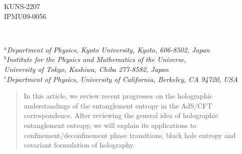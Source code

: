 \documentclass[12pt]{article}
\begin{document}
\begin{titlepage}
\thispagestyle{empty}
\begin{flushright}
KUNS-2207\\
IPMU09-0056
\end{flushright}

\bigskip

\begin{center}
\\
\vspace{2cm} 

\vspace{1cm}
  {\it
 $^{a}$Department of Physics, Kyoto University, Kyoto, 606-8502, Japan\\
 $^{b}$Institute for the Physics and Mathematics of the Universe, \\
 University of Tokyo, Kashiwa, Chiba 277-8582, Japan\\
  $^{c}$Department of Physics, University of California, Berkeley, CA 94720, USA}
\end{center}

\begin{abstract}
In this article, we review recent progresses on the holographic
understandings of the
entanglement entropy in the AdS/CFT correspondence.
After reviewing the general idea of holographic entanglement entropy, we will
explain its applications to confinement/deconfinement phase transitions, black hole
entropy and covariant formulation of holography.

\end{abstract}



\end{titlepage}

\newpage

\tableofcontents

\newpage
\end{document}
